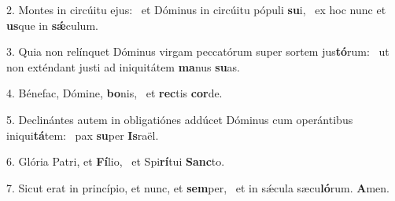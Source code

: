 2. Montes in circúitu ejus: \dag\  et Dóminus in circúitu pópuli \textbf{su}i, \ast\  ex hoc nunc et \textbf{us}que in \textbf{sǽ}culum.\

3. Quia non relínquet Dóminus virgam peccatórum super sortem jus\textbf{tó}rum: \ast\  ut non exténdant justi ad iniquitátem \textbf{ma}nus \textbf{su}as.\

4. Bénefac, Dómine, \textbf{bo}nis, \ast\  et \textbf{rec}tis \textbf{cor}de.\

5. Declinántes autem in obligatiónes addúcet Dóminus cum operántibus iniqui\textbf{tá}tem: \ast\  pax \textbf{su}per \textbf{Is}raël.\

6. Glória Patri, et \textbf{Fí}lio, \ast\  et Spi\textbf{rí}tui \textbf{Sanc}to.\

7. Sicut erat in princípio, et nunc, et \textbf{sem}per, \ast\  et in sǽcula sæcu\textbf{ló}rum. \textbf{A}men.\

